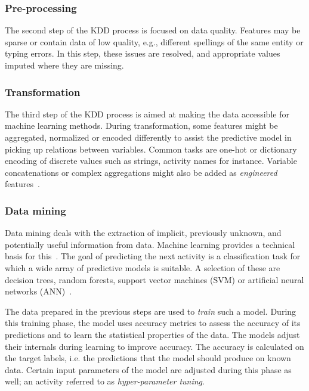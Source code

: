 \subsubsection*{Pre-processing}
The second step of the KDD process is focused on data quality. Features may be sparse or contain data of low quality, e.g., different spellings of the same entity or typing errors. In this step, these issues are resolved, and appropriate values imputed where they are missing.

\subsubsection*{Transformation}\label{sec:predictive-model-development:transformation}
The third step of the KDD process is aimed at making the data accessible for machine learning methods. During transformation, some features might be aggregated, normalized or encoded differently to assist the predictive model in picking up relations between variables. Common tasks are one-hot or dictionary encoding of discrete values such as strings, activity names for instance. Variable concatenations or complex aggregations might also be added as \textit{engineered} features~\cite{kuhn2013applied}.

\subsubsection*{Data mining}
Data mining deals with the extraction of implicit, previously unknown, and potentially useful information from data. Machine learning provides a technical basis for this~\cite{Aalst2016}. The goal of predicting the next activity is a classification task for which a wide array of predictive models is suitable. A selection of these are decision trees, random forests, support vector machines (SVM) or artificial neural networks (ANN)~\cite{kuhn2013applied}.

The data prepared in the previous steps are used to \textit{train} such a model. During this training phase, the model uses accuracy metrics to assess the accuracy of its predictions and to learn the statistical properties of the data. The models adjust their internals during learning to improve accuracy. The accuracy is calculated on the target labels, i.e. the predictions that the model should produce on known data.
Certain input parameters of the model are adjusted during this phase as well; an activity referred to as \textit{hyper-parameter tuning}.

